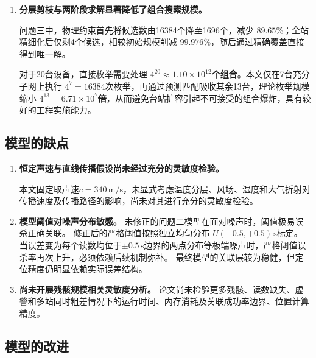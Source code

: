 \documentclass[draft,12pt,a4paper]{ctexart}
\theoremstyle{definition}
\begin{document}
\begin{enumerate}[label=\arabic*.]
\item \textbf{分层剪枝与两阶段求解显著降低了组合搜索规模。}

问题三中，物理约束首先将候选数由16384个降至1696个，减少
\textbf{$89.65\%$}；全站精细化后仅剩4个候选，相较初始规模削减
\textbf{$99.976\%$}，随后通过精确覆盖直接得到唯一解。

对于20台设备，直接枚举需要处理
\textbf{$4^{20}\approx1.10\times10^{12}$个组合}。本文仅在7台充分子网上执行
$4^7=16384$次枚举，再通过预测匹配吸收其余13台，理论枚举规模缩小
\textbf{$4^{13}=6.71\times10^7$倍}，从而避免台站扩容引起不可接受的组合爆炸，具有较好的工程实施能力。

\end{enumerate}


\subsection{模型的缺点}

\begin{enumerate}[label=\arabic*.]

\item \textbf{恒定声速与直线传播假设尚未经过充分的灵敏度检验。}

本文固定取声速$c=340\,\mathrm{m/s}$，未显式考虑温度分层、风场、湿度和大气折射对传播速度及传播路径的影响，尚未对其进行充分的灵敏度检验。

\item \textbf{模型阈值对噪声分布敏感。}
未修正的问题二模型在面对噪声时，阈值极易误杀正确关联。
修正后的严格阈值按照独立均匀分布
$U(-0.5,+0.5)\,\mathrm{s}$标定。
当误差变为每个读数均位于$\pm0.5\,\mathrm{s}$边界的两点分布等极端噪声时，严格阈值误杀率再次上升，必须依赖后续机制弥补。
最终模型的关联层较为稳健，但定位精度仍明显依赖实际误差结构。

\item \textbf{尚未开展残骸规模相关灵敏度分析。}
论文尚未检验更多残骸、读数缺失、虚警和多站同时粗差情况下的运行时间、内存消耗及关联成功率边界、位置计算精度。
\end{enumerate}


\subsection{模型的改进}
\end{document}
